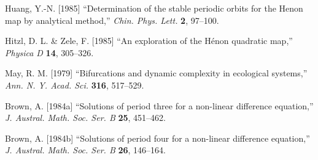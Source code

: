 \documentclass{ws-ijbc}
\begin{document}
\begin{thebibliography}{50}
  Huang, Y.-N. [1985]
  ``Determination of the stable periodic orbits for the Henon map by analytical method,''
  {\it Chin. Phys. Lett.}
  \textbf{2},
  97--100.

  Hitzl, D. L. \& Zele, F. [1985]
  ``An exploration of the H\'enon quadratic map,''
  {\it Physica D}
  \textbf{14},
  305--326.

  May, R. M. [1979]
  ``Bifurcations and dynamic complexity in ecological systems,''
  {\it Ann. N. Y. Acad. Sci.}
  \textbf{316},
  517--529.

  Brown, A. [1984a]
  ``Solutions of period three for a non-linear difference equation,''
  {\it J. Austral. Math. Soc. Ser. B}
  \textbf{25},
  451--462.

  Brown, A. [1984b]
  ``Solutions of period four for a non-linear difference equation,''
  {\it J. Austral. Math. Soc. Ser. B}
  \textbf{26},
  146--164.


\end{thebibliography}
\end{document}
